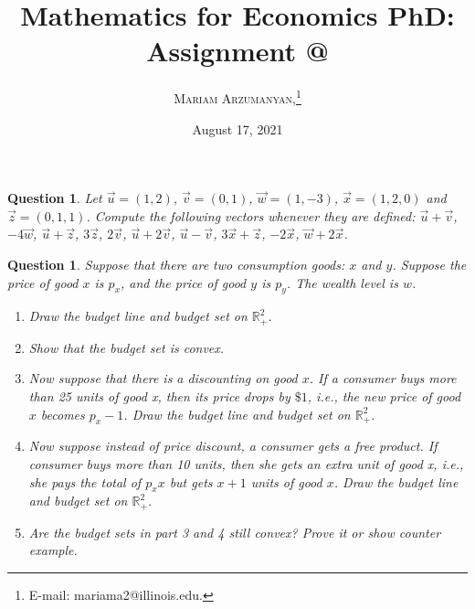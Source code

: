 \documentclass[12pt]{article}
\makeatletter
\newtheorem{ques}[theorem]{Question}
\newcommand*{\rom}[1]{\expandafter\@slowromancap\romannumeral #1@}
\makeatother
\begin{document}
\setcounter{footnote}{0}
\title{Mathematics for Economics PhD: Assignment \rom{2}}
\author{\textsc{Mariam Arzumanyan,}\thanks {   E-mail: mariama2@illinois.edu.} \\ } 


\date{August 17, 2021}


\maketitle 


\begin{ques}
Let $\vec{u}=(1,2)$, $\vec{v}=(0,1)$, $\vec{w}=(1,-3)$, $\vec{x}=(1,2,0)$ and $\vec{z}=(0,1,1)$.
Compute the following vectors whenever they are defined: $\vec{u}+\vec{v}$, $-4\vec{w}$, $\vec{u}
+\vec{z}$, $3\vec{z}$, $2\vec{v}$, $\vec{u}+2\vec{v}$, $\vec{u}-\vec{v}$, $3\vec{x}+\vec{z}$, $-2\vec{x}$, $\vec{w}+2\vec{x}$.

\end{ques}



\newpage

\begin{ques}
Suppose that there are two consumption goods: $x$ and $y$. Suppose the price of good $x$ is $p_x$, and the price of good $y$ is $p_y$. The wealth level is $w$. 
\begin{enumerate}
    \item Draw the budget line and budget set on $\mathbb{R}_+^2$. 
    \item Show that the budget set is convex. 
    \item Now suppose that there is a discounting on good $x$. If a consumer buys more than 25 units of good x, then its price drops by $\$1$, i.e., the new price of good $x$ becomes $p_x-1$. Draw the budget line and budget set on $\mathbb{R}_+^2$.
    \item Now suppose instead of price discount, a consumer gets a free product. If consumer buys more than 10 units, then she gets an extra unit of good x, i.e., she pays the total of $p_xx$ but gets $x+1$ units of good $x$.  Draw the budget line and budget set on $\mathbb{R}_+^2$.
    \item Are the budget sets in part 3 and 4 still convex? Prove it or show counter example. 
\end{enumerate}
\end{ques}
\end{document}
